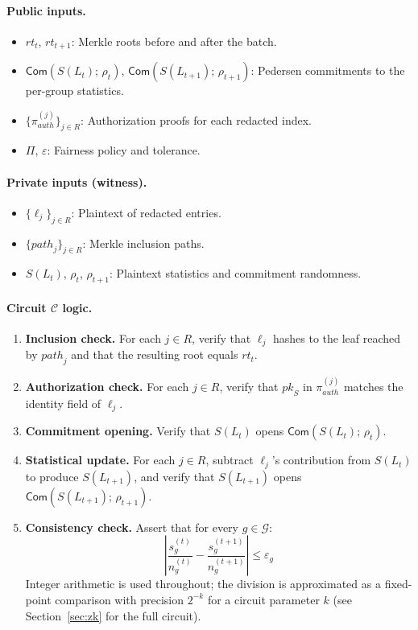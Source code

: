 \paragraph{Public inputs.}
\begin{itemize}
  \item $\mathit{rt}_t$, $\mathit{rt}_{t+1}$: Merkle roots before and
  after the batch.
  \item $\mathsf{Com}(S(L_t);\, \rho_t)$,
  $\mathsf{Com}(S(L_{t+1});\, \rho_{t+1})$: Pedersen commitments to the
  per-group statistics.
  \item $\{\pi_{\mathit{auth}}^{(j)}\}_{j \in R}$: Authorization proofs
  for each redacted index.
  \item $\Pi$, $\varepsilon$: Fairness policy and tolerance.
\end{itemize}

\paragraph{Private inputs (witness).}
\begin{itemize}
  \item $\{\ell_j\}_{j \in R}$: Plaintext of redacted entries.
  \item $\{\mathit{path}_j\}_{j \in R}$: Merkle inclusion paths.
  \item $S(L_t)$, $\rho_t$, $\rho_{t+1}$: Plaintext statistics and
  commitment randomness.
\end{itemize}

\paragraph{Circuit $\mathcal{C}$ logic.}
\begin{enumerate}
  \item \textbf{Inclusion check.} For each $j \in R$, verify that
  $\ell_j$ hashes to the leaf reached by $\mathit{path}_j$ and that the
  resulting root equals $\mathit{rt}_t$.
  \item \textbf{Authorization check.} For each $j \in R$, verify that
  $\mathit{pk}_S$ in $\pi_{\mathit{auth}}^{(j)}$ matches the identity
  field of $\ell_j$.
  \item \textbf{Commitment opening.} Verify that $S(L_t)$ opens
  $\mathsf{Com}(S(L_t);\, \rho_t)$.
  \item \textbf{Statistical update.} For each $j \in R$, subtract
  $\ell_j$'s contribution from $S(L_t)$ to produce $S(L_{t+1})$, and
  verify that $S(L_{t+1})$ opens $\mathsf{Com}(S(L_{t+1});\,\rho_{t+1})$.
  \item \textbf{Consistency check.} Assert that for every $g \in
  \mathcal{G}$:
  \[
    \left|
      \frac{s_g^{(t)}}{n_g^{(t)}} - \frac{s_g^{(t+1)}}{n_g^{(t+1)}}
    \right| \leq \varepsilon_g
  \]
  Integer arithmetic is used throughout; the division is approximated as
  a fixed-point comparison with precision $2^{-k}$ for a circuit
  parameter $k$ (see Section~\ref{sec:zk} for the full circuit).
\end{enumerate}

